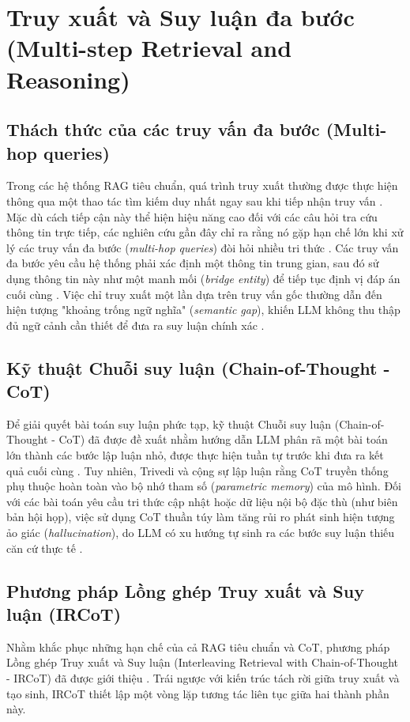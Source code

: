 \section{Truy xuất và Suy luận đa bước (Multi-step Retrieval and Reasoning)}

\subsection{Thách thức của các truy vấn đa bước (Multi-hop queries)}
Trong các hệ thống RAG tiêu chuẩn, quá trình truy xuất thường được thực hiện thông qua một thao tác tìm kiếm duy nhất ngay sau khi tiếp nhận truy vấn \cite{lewis2020retrieval}. Mặc dù cách tiếp cận này thể hiện hiệu năng cao đối với các câu hỏi tra cứu thông tin trực tiếp, các nghiên cứu gần đây chỉ ra rằng nó gặp hạn chế lớn khi xử lý các truy vấn đa bước (\textit{multi-hop queries}) đòi hỏi nhiều tri thức \cite{xiong2020answering}. Các truy vấn đa bước yêu cầu hệ thống phải xác định một thông tin trung gian, sau đó sử dụng thông tin này như một manh mối (\textit{bridge entity}) để tiếp tục định vị đáp án cuối cùng \cite{yang2018hotpotqa}. Việc chỉ truy xuất một lần dựa trên truy vấn gốc thường dẫn đến hiện tượng "khoảng trống ngữ nghĩa" (\textit{semantic gap}), khiến LLM không thu thập đủ ngữ cảnh cần thiết để đưa ra suy luận chính xác \cite{xiong2020answering}.

\subsection{Kỹ thuật Chuỗi suy luận (Chain-of-Thought - CoT)}
Để giải quyết bài toán suy luận phức tạp, kỹ thuật Chuỗi suy luận (Chain-of-Thought - CoT) đã được đề xuất nhằm hướng dẫn LLM phân rã một bài toán lớn thành các bước lập luận nhỏ, được thực hiện tuần tự trước khi đưa ra kết quả cuối cùng \cite{wei2022chain}. Tuy nhiên, Trivedi và cộng sự \cite{trivedi2023interleaving} lập luận rằng CoT truyền thống phụ thuộc hoàn toàn vào bộ nhớ tham số (\textit{parametric memory}) của mô hình. Đối với các bài toán yêu cầu tri thức cập nhật hoặc dữ liệu nội bộ đặc thù (như biên bản hội họp), việc sử dụng CoT thuần túy làm tăng rủi ro phát sinh hiện tượng ảo giác (\textit{hallucination}), do LLM có xu hướng tự sinh ra các bước suy luận thiếu căn cứ thực tế \cite{ji2023survey}.

\subsection{Phương pháp Lồng ghép Truy xuất và Suy luận (IRCoT)}
Nhằm khắc phục những hạn chế của cả RAG tiêu chuẩn và CoT, phương pháp Lồng ghép Truy xuất và Suy luận (Interleaving Retrieval with Chain-of-Thought - IRCoT) đã được giới thiệu \cite{trivedi2023interleaving}. Trái ngược với kiến trúc tách rời giữa truy xuất và tạo sinh, IRCoT thiết lập một vòng lặp tương tác liên tục giữa hai thành phần này.

